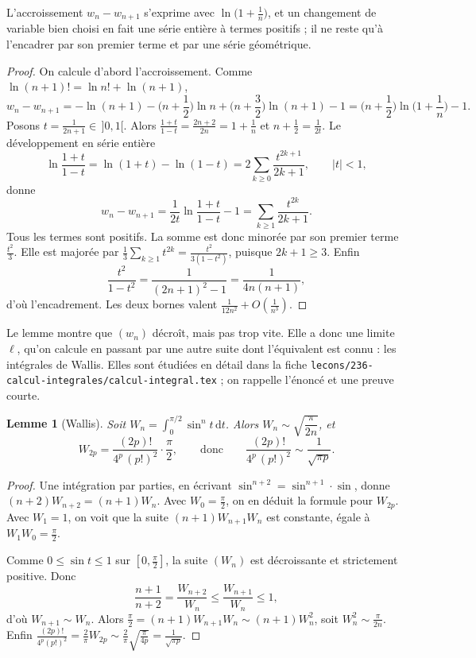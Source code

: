 \documentclass[11pt,a4paper]{article}
\theoremstyle{plain}
\newtheorem{lemme}[theoreme]{Lemme}
\theoremstyle{definition}
\theoremstyle{remark}
\newcommand{\dd}{\,\mathrm{d}}
\begin{document}
L'accroissement $w_n-w_{n+1}$ s'exprime avec $\ln\big(1+\frac1n\big)$, et un changement de variable bien choisi en fait une série entière à termes positifs ; il ne reste qu'à l'encadrer par son premier terme et par une série géométrique.

\begin{proof}
On calcule d'abord l'accroissement. Comme $\ln(n+1)!=\ln n!+\ln(n+1)$,
\[
  w_n-w_{n+1}=-\ln(n+1)-\Big(n+\frac12\Big)\ln n+\Big(n+\frac32\Big)\ln(n+1)-1
  =\Big(n+\frac12\Big)\ln\Big(1+\frac1n\Big)-1 .
\]
Posons $t=\frac1{2n+1}\in\,]0,1[$. Alors $\frac{1+t}{1-t}=\frac{2n+2}{2n}=1+\frac1n$ et $n+\frac12=\frac1{2t}$. Le développement en série entière
\[
  \ln\frac{1+t}{1-t}=\ln(1+t)-\ln(1-t)=2\sum_{k\geq0}\frac{t^{2k+1}}{2k+1},\qquad|t|<1,
\]
donne
\[
  w_n-w_{n+1}=\frac1{2t}\ln\frac{1+t}{1-t}-1=\sum_{k\geq1}\frac{t^{2k}}{2k+1}.
\]
Tous les termes sont positifs. La somme est donc minorée par son premier terme $\frac{t^2}3$. Elle est majorée par $\frac13\sum_{k\geq1}t^{2k}=\frac{t^2}{3(1-t^2)}$, puisque $2k+1\geq3$. Enfin
\[
  \frac{t^2}{1-t^2}=\frac1{(2n+1)^2-1}=\frac1{4n(n+1)},
\]
d'où l'encadrement. Les deux bornes valent $\frac1{12n^2}+O(\frac1{n^3})$.
\end{proof}

Le lemme montre que $(w_n)$ décroît, mais pas trop vite. Elle a donc une limite $\ell$, qu'on calcule en passant par une autre suite dont l'équivalent est connu : les intégrales de Wallis. Elles sont étudiées en détail dans la fiche \texttt{lecons/236-calcul-integrales/calcul-integral.tex} ; on rappelle l'énoncé et une preuve courte.

\begin{lemme}[Wallis]\label{lem:wallis}
Soit $W_n=\int_0^{\pi/2}\sin^nt\dd t$. Alors $W_n\sim\sqrt{\dfrac{\pi}{2n}}$, et
\[
  W_{2p}=\frac{(2p)!}{4^p\,(p!)^2}\cdot\frac\pi2,
  \qquad\text{donc}\qquad
  \frac{(2p)!}{4^p\,(p!)^2}\sim\frac1{\sqrt{\pi p}} .
\]
\end{lemme}

\begin{proof}
Une intégration par parties, en écrivant $\sin^{n+2}=\sin^{n+1}\cdot\sin$, donne $(n+2)W_{n+2}=(n+1)W_n$. Avec $W_0=\frac\pi2$, on en déduit la formule pour $W_{2p}$. Avec $W_1=1$, on voit que la suite $(n+1)W_{n+1}W_n$ est constante, égale à $W_1W_0=\frac\pi2$.

Comme $0\leq\sin t\leq1$ sur $[0,\frac\pi2]$, la suite $(W_n)$ est décroissante et strictement positive. Donc
\[
  \frac{n+1}{n+2}=\frac{W_{n+2}}{W_n}\leq\frac{W_{n+1}}{W_n}\leq1,
\]
d'où $W_{n+1}\sim W_n$. Alors $\frac\pi2=(n+1)W_{n+1}W_n\sim(n+1)W_n^2$, soit $W_n^2\sim\frac\pi{2n}$. Enfin $\frac{(2p)!}{4^p(p!)^2}=\frac2\pi W_{2p}\sim\frac2\pi\sqrt{\frac{\pi}{4p}}=\frac1{\sqrt{\pi p}}$.
\end{proof}
\end{document}
